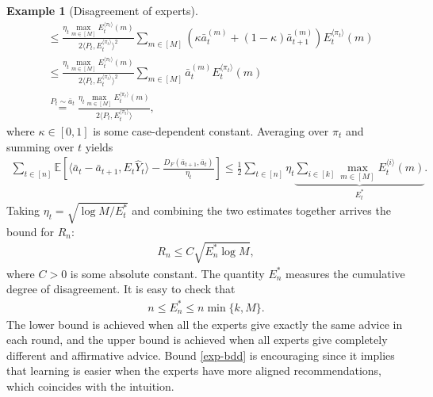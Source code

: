 \documentclass[letterpaper,11pt,openright,openany]{book}
\numberwithin{equation}{section}
\theoremstyle{plain}
\theoremstyle{definition}
\newtheorem{Ex}[Th]{Example}
\def\E{{\mathbb E}}
\begin{document}
\begin{Ex}[Disagreement of experts]
\begin{align*}
& \leq\frac{\eta_t\max_{m\in [M]}E_{t}^{\langle \pi_t \rangle}(m)}{2\langle P_t, E_t^{\langle\pi_t\rangle}\rangle^2}\sum_{m\in [M]}\left(\kappa \bar{a}_t^{(m)}+(1-\kappa) \bar{a}_{t+1}^{(m)}\right)E_t^{\langle\pi_t\rangle}(m)\\
&\leq\frac{\eta_t\max_{m\in [M]}E_{t}^{\langle \pi_t \rangle}(m)}{2\langle P_t, E_t^{\langle\pi_t\rangle}\rangle^2}\sum_{m\in [M]}\bar{a}_t^{(m)}E_t^{\langle\pi_t\rangle}(m)\\
&\stackrel{P_t\sim\bar{a}_t}{=}\frac{\eta_t\max_{m\in [M]}E_{t}^{\langle \pi_t \rangle}(m)}{2\langle P_t, E_t^{\langle\pi_t\rangle}\rangle},
\end{align*} 
where $\kappa\in [0,1]$ is some case-dependent constant. Averaging over $\pi_t$ and summing over $t$ yields
\begin{align*}
\sum_{t\in [n]}\E\left[\langle \bar{a}_t- \bar{a}_{t+1}, E_t\hat{Y}_t\rangle-\frac{D_F(\bar{a}_{t+1}, \bar{a}_t)}{\eta_t}\right]\leq\frac{1}{2}\sum_{t\in [n]}\eta_t\underbrace{\sum_{i\in [k]}\max_{m\in [M]}E_t^{\langle i \rangle}(m)}_{E^*_t}. 
\end{align*}
Taking $\eta_t = \sqrt{\log M/E_t^*}$ and combining the two estimates together arrives the bound for $R_n$:
\begin{align}
R_n\leq C\sqrt{E_n^*\log M}, \label{exp-bdd}
\end{align}
where $C>0$ is some absolute constant. The quantity $E_n^*$ measures the cumulative degree of disagreement. It is easy to check that
\begin{align*}
n\leq E_n^*\leq n\min\{k, M\}.
\end{align*}
The lower bound is achieved when all the experts give exactly the same advice in each round, and the upper bound is achieved when all experts give completely different and affirmative advice.  Bound \eqref{exp-bdd} is encouraging since it implies that learning is easier when the experts have more aligned recommendations, which coincides with the intuition.  
\end{Ex}
\end{document}
